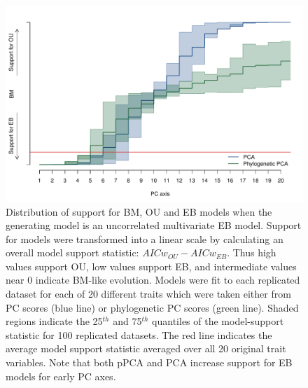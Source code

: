 \documentclass[a4paper,11pt]{article}
\begin{document}
\begin{figure}[p]
\centering
\includegraphics[scale=0.65]{./fig/uncor-eb-aic.pdf}
\caption{Distribution of support for BM, OU and EB models when the generating model is an uncorrelated multivariate EB model. Support for models were transformed into a linear scale by calculating an overall model support statistic: $AICw_{OU} - AICw_{EB}$. Thus high values support OU, low values support EB, and intermediate values near 0 indicate BM-like evolution. Models were fit to each replicated dataset for each of 20 different traits which were taken either from PC scores (blue line) or phylogenetic PC scores (green line). Shaded regions indicate the 25$^{th}$ and 75$^{th}$ quantiles of the model-support statistic for 100 replicated datasets. The red  line indicates the average model support statistic averaged over all 20 original trait variables. Note that both pPCA and PCA increase support for EB models for early PC axes.}
\label{aicweb}
\end{figure}
\end{document}
